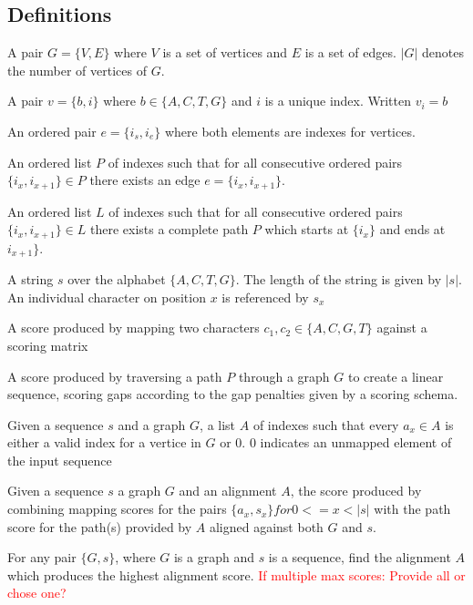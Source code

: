 \documentclass[thesis.tex]{subfiles}
\begin{document}
\subsection{Definitions}
\begin{defn}
	A pair $G=\{V,E\}$ where $V$ is a set of vertices and $E$ is a set of edges. $|G|$ denotes the number of vertices of $G$.
\end{defn}
\begin{defn}[Vertice]
	A pair $v=\{b, i\}$ where $b \in \{A, C, T, G\}$ and $i$ is a unique index. Written $v_i=b$
\end{defn}
\begin{defn}[Edge]
	An ordered pair $e=\{i_s, i_e\}$ where both elements are indexes for vertices. 
\end{defn}
\begin{defn}
	An ordered list $P$ of indexes such that for all consecutive ordered pairs $\{i_x, i_{x+1}\} \in P$ there exists an edge $e=\{i_x, i_{x+1}\}$.
\end{defn}
\begin{defn}[Path]
	An ordered list $L$ of indexes such that for all consecutive ordered pairs $\{i_x, i_{x+1}\} \in L$ there exists a complete path $P$ which starts at $\{i_x\}$ and ends at $i_{x+1}\}$.
\end{defn}
\begin{defn}
	A string $s$ over the alphabet $\{A, C, T, G\}$. The length of the string is given by $|s|$. An individual character on position $x$ is referenced by $s_x$
\end{defn}
\begin{defn}
	A score produced by mapping two characters $c_1, c_2 \in \{A, C, G, T\}$ against a scoring matrix
\end{defn}
\begin{defn}
	A score produced by traversing a path $P$ through a graph $G$ to create a linear sequence, scoring gaps according to the gap penalties given by a scoring schema.
\end{defn}
\begin{defn}[Alignment]
	Given a sequence $s$ and a graph $G$, a list $A$ of indexes such that every $a_x \in A$ is either a valid index for a vertice in $G$ or $0$. $0$ indicates an unmapped element of the input sequence
\end{defn}
\begin{defn}
	Given a sequence $s$ a graph $G$ and an alignment $A$, the score produced by combining mapping scores for the pairs $\{a_x, s_x\} for 0<=x<|s|$ with the path score for the path(s) provided by $A$ aligned against both $G$ and $s$.
\end{defn}
\begin{defn}
	For any pair $\{G, s\}$, where $G$ is a graph and $s$ is a sequence, find the alignment $A$ which produces the highest alignment score.
	\textcolor{red}{If multiple max scores: Provide all or chose one?}
\end{defn}
\end{document}
